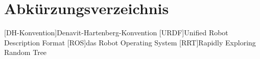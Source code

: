 \chapter*{Abkürzungsverzeichnis}

\begin{acronym}
 \setlength{\itemsep}{-0.5cm}
 [DH-Konvention]{Denavit-Hartenberg-Konvention}
 [URDF]{Unified Robot Description Format}
 [ROS]{das Robot Operating System}
 [RRT]{Rapidly Exploring Random Tree}
\end{acronym}

